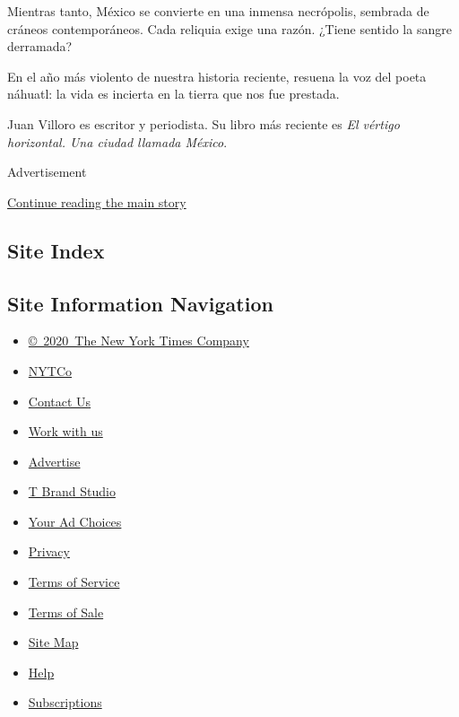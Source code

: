 Mientras tanto, México se convierte en una inmensa necrópolis, sembrada
de cráneos contemporáneos. Cada reliquia exige una razón. ¿Tiene sentido
la sangre derramada?

En el año más violento de nuestra historia reciente, resuena la voz del
poeta náhuatl: la vida es incierta en la tierra que nos fue prestada.

Juan Villoro es escritor y periodista. Su libro más reciente es \emph{El
vértigo horizontal. Una ciudad llamada México}.

Advertisement

\protect\hyperlink{after-bottom}{Continue reading the main story}

\hypertarget{site-index}{%
\subsection{Site Index}\label{site-index}}

\hypertarget{site-information-navigation}{%
\subsection{Site Information
Navigation}\label{site-information-navigation}}

\begin{itemize}
\tightlist
\item
  \href{https://help.nytimes.com/hc/en-us/articles/115014792127-Copyright-notice}{©~2020~The
  New York Times Company}
\end{itemize}

\begin{itemize}
\tightlist
\item
  \href{https://www.nytco.com/}{NYTCo}
\item
  \href{https://help.nytimes.com/hc/en-us/articles/115015385887-Contact-Us}{Contact
  Us}
\item
  \href{https://www.nytco.com/careers/}{Work with us}
\item
  \href{https://nytmediakit.com/}{Advertise}
\item
  \href{http://www.tbrandstudio.com/}{T Brand Studio}
\item
  \href{https://www.nytimes.com/privacy/cookie-policy\#how-do-i-manage-trackers}{Your
  Ad Choices}
\item
  \href{https://www.nytimes.com/privacy}{Privacy}
\item
  \href{https://help.nytimes.com/hc/en-us/articles/115014893428-Terms-of-service}{Terms
  of Service}
\item
  \href{https://help.nytimes.com/hc/en-us/articles/115014893968-Terms-of-sale}{Terms
  of Sale}
\item
  \href{https://spiderbites.nytimes.com}{Site Map}
\item
  \href{https://help.nytimes.com/hc/en-us}{Help}
\item
  \href{https://www.nytimes.com/subscription?campaignId=37WXW}{Subscriptions}
\end{itemize}
